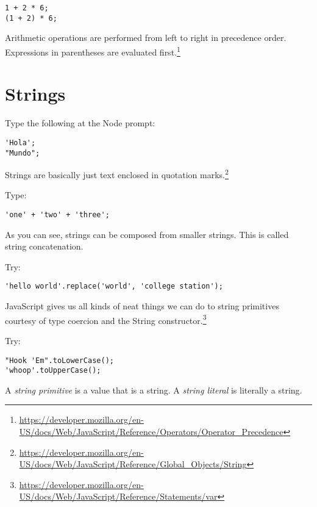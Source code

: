\documentclass{article}
\begin{document}
\begin{lstlisting}
1 + 2 * 6;
(1 + 2) * 6;
\end{lstlisting}

Arithmetic operations are performed from left to right in precedence order. Expressions in parentheses are evaluated first.\footnote{\url{https://developer.mozilla.org/en-US/docs/Web/JavaScript/Reference/Operators/Operator_Precedence}}

\section{Strings}
Type the following at the Node prompt:

\begin{lstlisting}
'Hola';
"Mundo";
\end{lstlisting}

Strings are basically just text enclosed in quotation marks.\footnote{\url{https://developer.mozilla.org/en-US/docs/Web/JavaScript/Reference/Global_Objects/String}}

Type:
\begin{lstlisting}
'one' + 'two' + 'three';
\end{lstlisting}

As you can see, strings can be composed from smaller strings. This is called string concatenation.

Try:
\begin{lstlisting}
'hello world'.replace('world', 'college station');
\end{lstlisting}

JavaScript gives us all kinds of neat things we can do to string primitives courtesy of type coercion and the String constructor.\footnote{\url{https://developer.mozilla.org/en-US/docs/Web/JavaScript/Reference/Statements/var}}

Try:
\begin{lstlisting}
"Hook 'Em".toLowerCase();
'whoop'.toUpperCase();
\end{lstlisting}

A \emph{string primitive} is a value that is a string. A \emph{string literal} is literally \textquotedbl a string\textquotedbl. 
\end{document}
